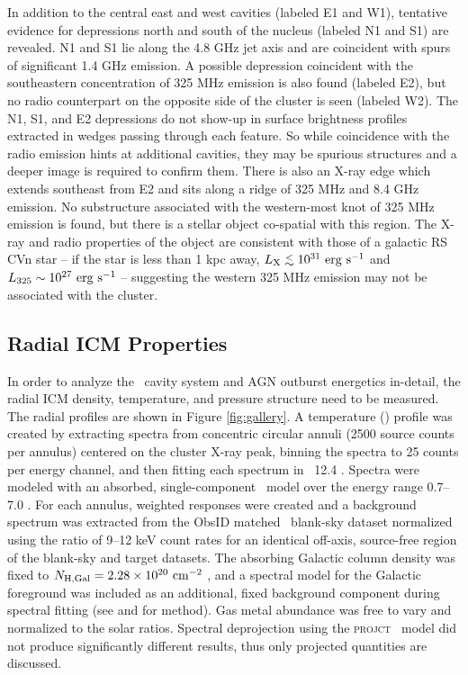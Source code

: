 \documentclass[iop]{emulateapj}
\begin{document}
In addition to the central east and west cavities (labeled E1 and W1),
tentative evidence for depressions north and south of the nucleus
(labeled N1 and S1) are revealed. N1 and S1 lie along the 4.8 GHz jet
axis and are coincident with spurs of significant 1.4 GHz emission. A
possible depression coincident with the southeastern concentration of
325 MHz emission is also found (labeled E2), but no radio counterpart
on the opposite side of the cluster is seen (labeled W2). The N1, S1,
and E2 depressions do not show-up in surface brightness profiles
extracted in wedges passing through each feature. So while coincidence
with the radio emission hints at additional cavities, they may be
spurious structures and a deeper image is required to confirm
them. There is also an X-ray edge which extends southeast from E2 and
sits along a ridge of 325 MHz and 8.4 GHz emission. No substructure
associated with the western-most knot of 325 MHz emission is found,
but there is a stellar object co-spatial with this region. The X-ray
and radio properties of the object are consistent with those of a
galactic RS CVn star \citep{1993RPPh...56.1145S} -- if the star is
less than 1 kpc away, $\lx \la 10^{31} ~\lum$ and $L_{325} \sim
10^{27} ~\rm{\mbox{\ensuremath{\rm{erg}}}~\ensuremath{\rm{\mbox{\ensuremath{\rm{s}}}^{-1}}}}$ -- suggesting the western 325 MHz emission may not be
associated with the cluster.

\subsection{Radial ICM Properties}
\label{sec:icm}

In order to analyze the \rbs\ cavity system and AGN outburst
energetics in-detail, the radial ICM density, temperature, and
pressure structure need to be measured. The radial profiles are shown
in Figure \ref{fig:gallery}. A temperature (\tx) profile was created
by extracting spectra from concentric circular annuli (2500 source
counts per annulus) centered on the cluster X-ray peak, binning the
spectra to 25 counts per energy channel, and then fitting each
spectrum in \xspec\ 12.4 \citep{xspec}. Spectra were modeled with an
absorbed, single-component \mekal\ model \citep{mekal1} over the
energy range 0.7--7.0 \keV. For each annulus, weighted responses were
created and a background spectrum was extracted from the ObsID matched
\caldb\ blank-sky dataset normalized using the ratio of 9--12 keV
count rates for an identical off-axis, source-free region of the
blank-sky and target datasets. The absorbing Galactic column density
was fixed to $N_{\rm{H,Gal}} = 2.28 \times 10^{20} ~\mbox{\ensuremath{\rm{cm^{-2}}}}$ \citep{lab}, and a
spectral model for the Galactic foreground was included as an
additional, fixed background component during spectral fitting (see
\citealt{2005ApJ...628..655V} and \citealt{xrayband} for method). Gas
metal abundance was free to vary and normalized to the \citet{ag89}
solar ratios. Spectral deprojection using the {\textsc{projct}}
\xspec\ model did not produce significantly different results, thus
only projected quantities are discussed.
\end{document}
